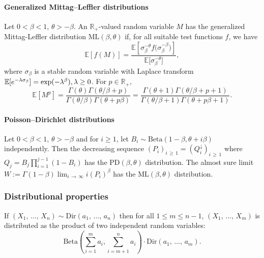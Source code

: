 \documentclass[AHL,Unicode,longabstracts,published]{cedram}
\newcommand{\Betal}{\mathrm{Beta}}
\newcommand{\ML}{\mathrm{ML}}
\newcommand{\PD}{\mathrm{PD}}
\newcommand{\Dir}{\mathrm{Dir}}
\newcommand{\R}{\mathbb{R}}
\newcommand{\bbE}{\mathbb{E}}
\newcommand{\R}{\mathbb{R}}
\begin{document}

\paragraph{Generalized Mittag--Leffler distributions} 
Let $0<\beta<1$, $\theta>-\beta$. An $\R_+$-valued random variable $M$ has the {generalized Mittag-Leffler distribution} $\ML(\beta,\theta)$ if, for all suitable test functions $f$, we have
\begin{equation}\label{def:ML}
\bbE\left[f(M)\right]= \frac{\bbE\left[\sigma_{\beta}^{-\theta}f\big(\sigma_{\beta}^{-\beta}\big)\right]}{\bbE\big[\sigma_{\beta}^{-\theta}\big]},
\end{equation}
where $\sigma_{\beta}$ is a stable random variable with Laplace transform $\bbE[e^{-\lambda \sigma_{\beta}}] = \exp(-\lambda^{\beta}),\lambda \linebreak\geq 0$. For $p \in \R_+$,
\[
\bbE\left[M^p\right]=\frac{\Gamma(\theta) \Gamma(\theta/\beta + p)}{\Gamma(\theta/\beta) \Gamma(\theta + p \beta)}=\frac{\Gamma(\theta+1) \Gamma(\theta/\beta + p+1)}{\Gamma(\theta/\beta+1) \Gamma(\theta + p \beta+1)}.
\]


\paragraph{Poisson--Dirichlet distributions}
Let $0<\beta<1$, $\theta>-\beta$ and for $i \ge 1$, let $B_i \sim \Betal(1-\beta, \theta + i \beta)$ independently. Then the decreasing sequence $(P_i)_{i\,\geq\,1}=(Q_i^{\downarrow})_{i\,\ge\,1}$ where $Q_j = B_j \prod_{i=1}^{j-1} (1 - B_i)$ has the $\PD(\beta,\theta)$ distribution. The almost sure limit $ W := \Gamma(1 - \beta) \lim_{i\,\to\,\infty} i (P_i)^{\beta}$ has the $\ML(\beta,\theta)$ distribution.

\subsubsection{Distributional properties}

\begin{lemm}\label{lem:DirichletBeta}
If $(X_1,\,\ldots,\,X_n) \sim \Dir(a_1,\,\ldots,\,a_n)$ then for all $1 \leq m \leq n-1$, $ (X_1,\,\ldots,\,X_m) $ is distributed as the product of two independent random variables:
\[
\Betal\left(\sum_{i=1}^m a_i,\sum_{i=m+1}^n a_i\right) \cdot \Dir(a_1,\,\ldots,\,a_m).
\]
\end{lemm}
\end{document}
